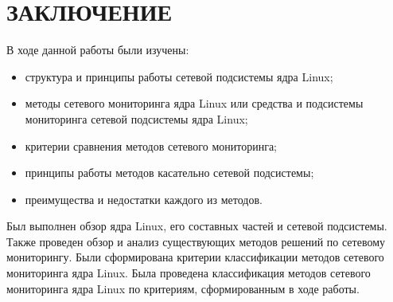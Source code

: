 \section*{\centering ЗАКЛЮЧЕНИЕ}

В ходе данной работы были изучены:
\begin{itemize}
	\item структура и принципы работы сетевой подсистемы ядра Linux;
	\item методы сетевого мониторинга ядра Linux или средства и подсистемы мониторинга сетевой подсистемы ядра Linux;
	\item критерии сравнения методов сетевого мониторинга;
	\item принципы работы методов касательно сетевой подсистемы;
	\item преимущества и недостатки каждого из методов. 
\end{itemize}

Был выполнен обзор ядра Linux, его составных частей и сетевой подсистемы. Также проведен обзор и анализ существующих методов решений по сетевому мониторингу. Были сформирована критерии классификации методов сетевого мониторинга ядра Linux. Была проведена классификация методов сетевого мониторинга ядра Linux по критериям, сформированным в ходе работы.


